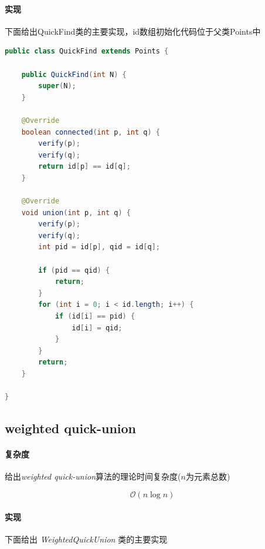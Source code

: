 \documentclass[12pt,a4paper]{ctexart}
\begin{document}
\paragraph{实现}下面给出QuickFind类的主要实现，id数组初始化代码位于父类Points中

\begin{lstlisting}[language=java,showstringspaces=false,]
    public class QuickFind extends Points {

    public QuickFind(int N) {
        super(N);
    }

    @Override
    boolean connected(int p, int q) {
        verify(p);
        verify(q);
        return id[p] == id[q];
    }

    @Override
    void union(int p, int q) {
        verify(p);
        verify(q);
        int pid = id[p], qid = id[q];

        if (pid == qid) {
            return;
        }
        for (int i = 0; i < id.length; i++) {
            if (id[i] == pid) {
                id[i] = qid;
            }
        }
        return;
    }

}
\end{lstlisting}
\subsection{weighted quick-union}
\paragraph{复杂度} 给出\textit{weighted quick-union}算法的理论时间复杂度($n$为元素总数)

\begin{equation}
    \nonumber
    \mathcal{O}(n\log{n})
\end{equation} 


\paragraph{实现}下面给出 \textit{WeightedQuickUnion} 类的主要实现
\end{document}
